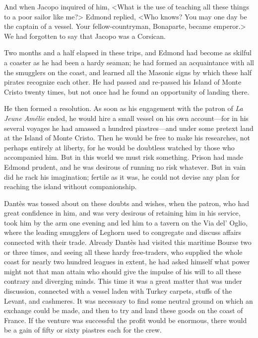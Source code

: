  And when Jacopo inquired of him, <What is the use of teaching all these things to a poor sailor like me?> Edmond replied, <Who knows? You may one day be the captain of a vessel. Your fellow-countryman, Bonaparte, became emperor.> We had forgotten to say that Jacopo was a Corsican. 

 Two months and a half elapsed in these trips, and Edmond had become as skilful a coaster as he had been a hardy seaman; he had formed an acquaintance with all the smugglers on the coast, and learned all the Masonic signs by which these half pirates recognize each other. He had passed and re-passed his Island of Monte Cristo twenty times, but not once had he found an opportunity of landing there. 

 He then formed a resolution. As soon as his engagement with the patron of \textit{La Jeune Amélie} ended, he would hire a small vessel on his own account—for in his several voyages he had amassed a hundred piastres—and under some pretext land at the Island of Monte Cristo. Then he would be free to make his researches, not perhaps entirely at liberty, for he would be doubtless watched by those who accompanied him. But in this world we must risk something. Prison had made Edmond prudent, and he was desirous of running no risk whatever. But in vain did he rack his imagination; fertile as it was, he could not devise any plan for reaching the island without companionship. 

 Dantès was tossed about on these doubts and wishes, when the patron, who had great confidence in him, and was very desirous of retaining him in his service, took him by the arm one evening and led him to a tavern on the Via del' Oglio, where the leading smugglers of Leghorn used to congregate and discuss affairs connected with their trade. Already Dantès had visited this maritime Bourse two or three times, and seeing all these hardy free-traders, who supplied the whole coast for nearly two hundred leagues in extent, he had asked himself what power might not that man attain who should give the impulse of his will to all these contrary and diverging minds. This time it was a great matter that was under discussion, connected with a vessel laden with Turkey carpets, stuffs of the Levant, and cashmeres. It was necessary to find some neutral ground on which an exchange could be made, and then to try and land these goods on the coast of France. If the venture was successful the profit would be enormous, there would be a gain of fifty or sixty piastres each for the crew. 

